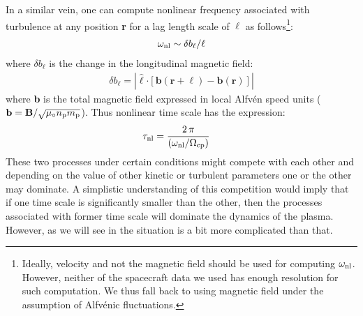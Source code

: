         In a similar vein, one can compute nonlinear frequency associated with turbulence at any
        position \textbf{r} for a lag length scale of $\ell$ as follows\footnote{Ideally, velocity
        and not the magnetic field should be used for computing $\omega_{\rm nl}$. However, neither
        of the spacecraft data we used has enough resolution for such computation. We thus fall back
        to using magnetic field under the assumption of Alfv\'enic fluctuations.}:
        \begin{align}
            \omega_{\rm nl} \sim \delta b_\ell/\ell \label{eq:omnl}
        \end{align}
        where $\delta b_\ell$ is the change in the longitudinal magnetic field:
        \begin{align}
            \delta b_{\ell} = \left \lvert\hat{\boldsymbol{\ell}}
            \mathbf{\cdot} \left[\mathbf{b} (\mathbf{r} + \boldsymbol{\ell}) - \mathbf{b}
            (\mathbf{r})\right]\right\lvert \label{eq:db}
        \end{align}
        where \textbf{b} is the total magnetic field expressed in local Alfv\'en speed units
        ($\mathbf{b} = \mathbf{B}/\sqrt{\mu_\circ n_{\rm p} m_{\rm p}}$). Thus nonlinear time scale
        has the expression:
        \begin{align}
            \tau_{\rm nl} & = \frac{2\,\pi}{\left(\omega_{\rm nl}/\Omega_{\rm cp}\right)} \label{eq:nlt}
        \end{align}
        These two processes under certain conditions might compete with each other and depending on
        the value of other kinetic or turbulent parameters one or the other may dominate. A
        simplistic understanding of this competition would imply that if one time scale is
        significantly smaller than the other, then the processes associated with former time scale
        will dominate the dynamics of the plasma. However, as we will see in  the
        situation is a bit more complicated than that.